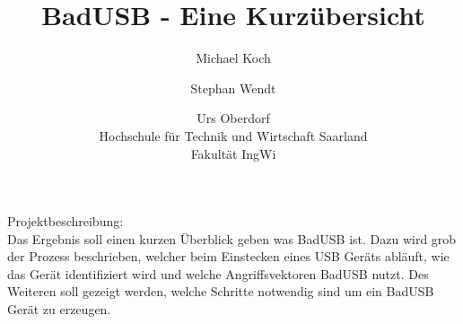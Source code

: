 \documentclass[ a4paper, 12pt, ]{article}
\title{BadUSB - Eine Kurzübersicht}
\author{Michael Koch \and{Stephan Wendt} \and{Urs Oberdorf}\\Hochschule für Technik und Wirtschaft Saarland\\Fakultät IngWi}
\date{} %
\begin{document}
\maketitle
Projektbeschreibung:\\
Das Ergebnis soll einen kurzen Überblick geben was BadUSB ist. Dazu wird grob der Prozess beschrieben,
welcher beim Einstecken eines USB Geräts abläuft, wie das Gerät identifiziert wird und welche 
Angriffsvektoren BadUSB nutzt. Des Weiteren soll gezeigt werden, welche Schritte notwendig sind um ein
BadUSB Gerät zu erzeugen.
\end{document}
